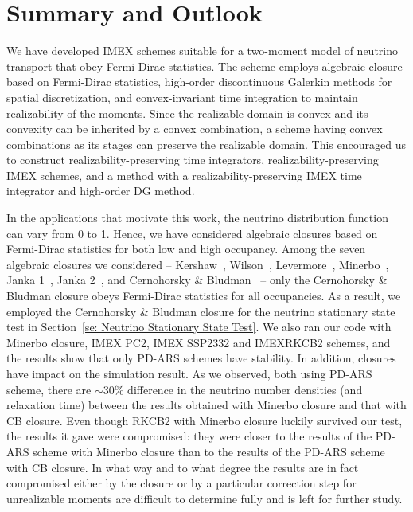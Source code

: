 \section{Summary and Outlook}\label{se:Summary}

We have developed IMEX schemes suitable for a two-moment model of neutrino transport that obey Fermi-Dirac statistics.
The scheme employs algebraic closure based on Fermi-Dirac statistics, high-order discontinuous Galerkin methods for spatial discretization, and convex-invariant time integration to maintain realizability of the moments.  
Since the realizable domain is convex and its convexity can be inherited by a convex combination, a scheme having convex combinations as its stages can preserve the realizable domain.
This encouraged us to construct realizability-preserving time integrators, realizability-preserving IMEX schemes, and a method with a realizability-preserving IMEX time integrator and high-order DG method.  

In the applications that motivate this work, the neutrino distribution function can vary from 0 to 1.  
Hence, we have considered algebraic closures based on Fermi-Dirac statistics for both low and high occupancy.  
Among the seven algebraic closures we considered -- Kershaw~\cite{kershaw_1976}, Wilson~\cite{wilson_1975,leblancWilson_1970}, Levermore~\cite{levermore_1984}, Minerbo~\cite{minerbo_1978}, Janka 1~\cite{janka_1991}, Janka 2~\cite{janka_1992}, and Cernohorsky \& Bludman~\cite{cernohorskyBludman_1994} -- only the Cernohorsky \& Bludman closure obeys Fermi-Dirac statistics for all occupancies.  
As a result, we employed the Cernohorsky \& Bludman closure for the neutrino stationary state test in Section~\ref{se: Neutrino Stationary State Test}.
We also ran our code with Minerbo closure, IMEX PC2, IMEX SSP2332 and IMEXRKCB2 schemes, and the results show that only PD-ARS schemes have stability.
In addition, closures have impact on the simulation result.
As we observed, both using PD-ARS scheme, there are $\sim30\%$ difference in the neutrino number densities (and relaxation time) between the results obtained with Minerbo closure and that with CB closure.
Even though RKCB2 with Minerbo closure luckily survived our test, the results it gave were compromised: they were closer to the results of the PD-ARS scheme with Minerbo closure than to the results of the PD-ARS scheme with CB closure.
In what way and to what degree the results are in fact compromised either by the closure or by a particular correction step for unrealizable moments are difficult to determine fully and is left for further study.


